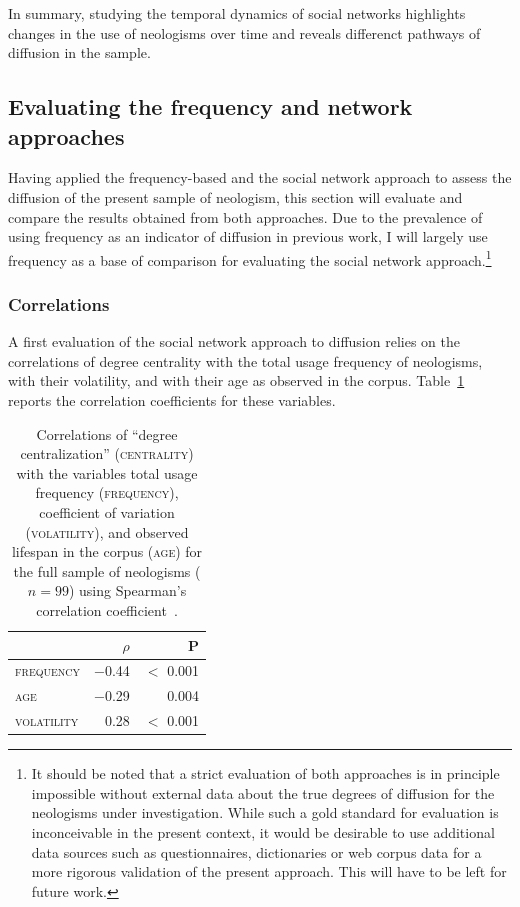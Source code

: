 \documentclass[
  a4paper,
  abstract=on,
  captions=tableabove
  ]{scrartcl}
\begin{document}
      In summary, studying the temporal dynamics of social networks highlights changes in the use of neologisms over time and reveals differenct pathways of diffusion in the sample.


  \subsection{Evaluating the frequency and network approaches}
    \label{subsec:nets-vs-freq}

    Having applied the frequency-based and the social network approach to assess the diffusion of the present sample of neologism, this section will evaluate and compare the results obtained from both approaches. Due to the prevalence of using frequency as an indicator of diffusion in previous work, I will largely use frequency as a base of comparison for evaluating the social network approach.\footnote{It should be noted that a strict evaluation of both approaches is in principle impossible without external data about the true degrees of diffusion for the neologisms under investigation. While such a gold standard for evaluation is inconceivable in the present context, it would be desirable to use additional data sources such as questionnaires, dictionaries or web corpus data for a more rigorous validation of the present approach. This will have to be left for future work.}

    \subsubsection{Correlations}

      A first evaluation of the social network approach to diffusion relies on the correlations of degree centrality with the total usage frequency of neologisms, with their volatility, and with their age as observed in the corpus. Table~\ref{tab:correlations} reports the correlation coefficients for these variables.

      \begin{table}
        \centering
        \caption[Correlation matrix for \textsc{centrality}]{Correlations of \enquote{degree centralization} (\textsc{centrality}) with the variables total usage frequency (\textsc{frequency}), coefficient of variation (\textsc{volatility}), and observed lifespan in the corpus (\textsc{age}) for the full sample of neologisms ($n=99$) using Spearman's correlation coefficient~\parencite{Spearman1961ProofMeasurement}.\protect\footnotemark{}}
        \label{tab:correlations}
        \begin{tabular}{>{\scshape}l r r}
          \toprule
                      & {$\rho$}    & P               \\
          \midrule
          frequency  & \num{-0.44} & $<$ \num{0.001} \\
          age        & \num{-0.29} & \num{0.004}     \\
          volatility & \num{0.28}  & $<$ \num{0.001} \\
          \bottomrule
        \end{tabular}
      \end{table}
\end{document}
